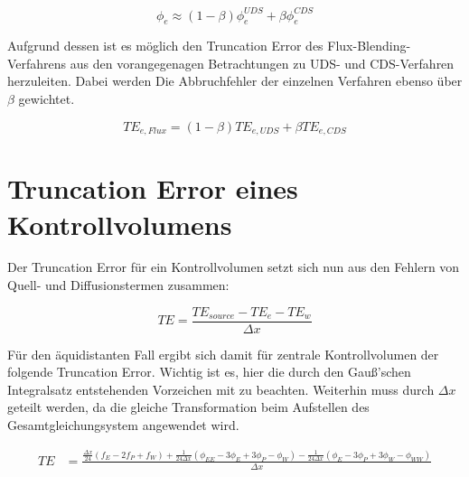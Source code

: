 \documentclass[11pt, ngerman,colorback,accentcolor=tud2d]{tudreport}
\begin{document}
\begin{equation*}
\phi_e \approx (1-\beta)\phi_e^{UDS} + \beta \phi_e^{CDS} 
\end{equation*}

Aufgrund dessen ist es möglich den Truncation Error des Flux-Blending-Verfahrens aus
den vorangegenagen Betrachtungen zu UDS- und CDS-Verfahren herzuleiten.
Dabei werden Die Abbruchfehler der einzelnen Verfahren ebenso über $\beta$ gewichtet.

\begin{equation}
  TE_{e, Flux} = (1-\beta) TE_{e, UDS} + \beta TE_{e, CDS}
\end{equation}



\section{Truncation Error eines Kontrollvolumens}
\label{sec:Truncation Error eines Kontrollvolumens}

Der Truncation Error für ein Kontrollvolumen setzt sich nun aus den Fehlern von Quell-
und Diffusionstermen zusammen:

\begin{equation*}
  TE = \frac{TE_{source} - TE_e - TE_w}{\Delta x}
\end{equation*}

Für den äquidistanten Fall ergibt sich damit für zentrale Kontrollvolumen der folgende
Truncation Error. Wichtig ist es, hier die durch den Gauß'schen Integralsatz 
entstehenden Vorzeichen mit zu beachten. Weiterhin muss durch $\Delta x$ geteilt werden,
da die gleiche Transformation beim Aufstellen des Gesamtgleichungsystem angewendet wird.

\begin{align}
  TE &= \frac{\frac{\Delta x}{24} \left({f_E-2f_P+f_W}\right)
   +\frac{1}{24\Delta x}\left({
\phi_{EE}-3\phi_E+3\phi_P-\phi_W}\right)
  -\frac{1}{24 \Delta x}\left({
\phi_E-3\phi_P+3\phi_W-\phi_{WW}}\right)}{\Delta x}
\end{align}



\end{document}
